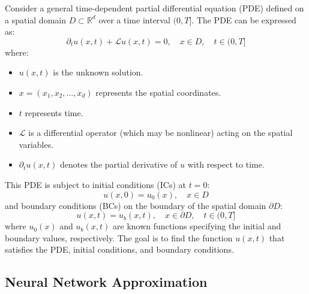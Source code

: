 \documentclass[11pt,twoside,openright]{report}
\begin{document}
Consider a general time-dependent partial differential equation (PDE) defined on a spatial domain $D \subset \mathbb{R}^d$ over a time interval $(0, T]$. The PDE can be expressed as:
\begin{equation}
\partial_t u(x, t) + \mathcal{L}u(x, t) = 0, \quad x \in D, \quad t \in (0, T]
\label{eq:general_pde}
\end{equation}
where:
\begin{itemize}
    \item $u(x, t)$ is the unknown solution.
    \item $x = (x_1, x_2, \dots, x_d)$ represents the spatial coordinates.
    \item $t$ represents time.
    \item $\mathcal{L}$ is a differential operator (which may be nonlinear) acting on the spatial variables.
    \item $\partial_t u(x, t)$ denotes the partial derivative of $u$ with respect to time.
\end{itemize}

This PDE is subject to initial conditions (ICs) at $t=0$:
$$
u(x, 0) = u_0(x), \quad x \in D
$$
and boundary conditions (BCs) on the boundary of the spatial domain $\partial D$:
$$
u(x, t) = u_b(x, t), \quad x \in \partial D, \quad t \in (0, T]
$$
where $u_0(x)$ and $u_b(x, t)$ are known functions specifying the initial and boundary values, respectively. The goal is to find the function $u(x, t)$ that satisfies the PDE, initial conditions, and boundary conditions.

\subsection{Neural Network Approximation}
\end{document}
